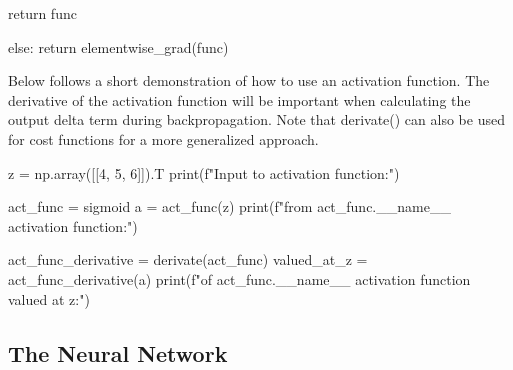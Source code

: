 \documentclass[%
oneside,                 %
final,                   %
10pt]{article}
\begin{document}
        return func

    else:
        return elementwise_grad(func)

\epycod


Below follows a short demonstration of how to use an activation
function. The derivative of the activation function will be important
when calculating the output delta term during backpropagation. Note
that derivate() can also be used for cost functions for a more
generalized approach.












\bpycod
z = np.array([[4, 5, 6]]).T
print(f"Input to activation function:")

act_func = sigmoid
a = act_func(z)
print(f"\nOutput from {act_func.__name__} activation function:")

act_func_derivative = derivate(act_func)
valued_at_z = act_func_derivative(a)
print(f"\nDerivative of {act_func.__name__} activation function valued at z:")

\epycod


\subsection{The Neural Network}
\end{document}
